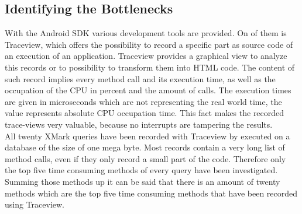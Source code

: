 \subsection{Identifying the Bottlenecks}
\label{sec:identifying-the-bottlenecks}
With the Android SDK various development tools are provided.
On of them is Traceview, which offers the possibility to record a specific part as source code of an execution of an application.
Traceview provides a graphical view to analyze this records or to possibility to transform them into HTML code.
The content of such record implies every method call and its execution time, as well as the occupation of the CPU in percent and the amount of calls.
The execution times are given in microseconds which are not representing the real world time, the value represents absolute CPU occupation time.
This fact makes the recorded trace-views very valuable, because no interrupts are tampering the results.\\
All twenty XMark queries have been recorded with Traceview by executed on a database of the size of one mega byte.
Most records contain a very long list of method calls, even if they only record a small part of the code.
Therefore only the top five time consuming methods of every query have been investigated.
Summing those methods up it can be said that there is an amount of twenty methods which are the top five time consuming methods that have been recorded using Traceview.
%
